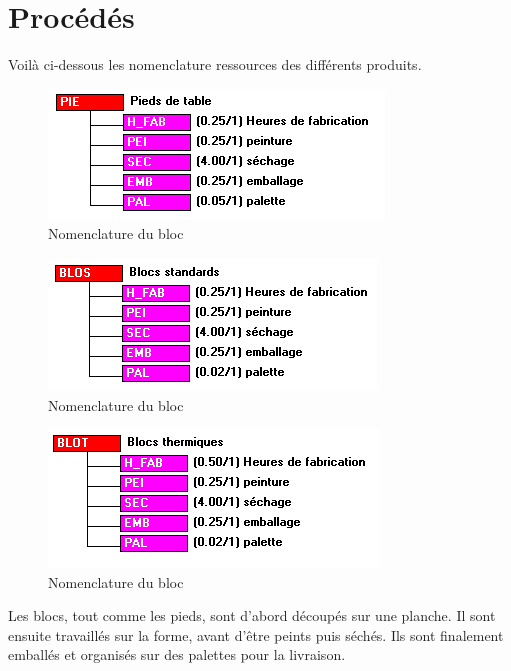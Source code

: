 \section{Procédés}

Voilà ci-dessous les nomenclature ressources des différents produits.

	\begin{figure}[H]
\centering
\includegraphics[scale=0.35]{./captures/pied.PNG}
\caption{Nomenclature du bloc}
	\end{figure}	
	
		\begin{figure}[H]
\centering
\includegraphics[scale=0.35]{./captures/standard.PNG}
\caption{Nomenclature du bloc}
	\end{figure}	
	
	
		\begin{figure}[H]
\centering
\includegraphics[scale=0.35]{./captures/thermique.PNG}
\caption{Nomenclature du bloc}
	\end{figure}	

Les blocs, tout comme les pieds, sont d'abord découpés sur une planche. Il sont ensuite travaillés sur la forme, avant d'être peints puis séchés. Ils sont finalement emballés et organisés sur des palettes pour la livraison.
